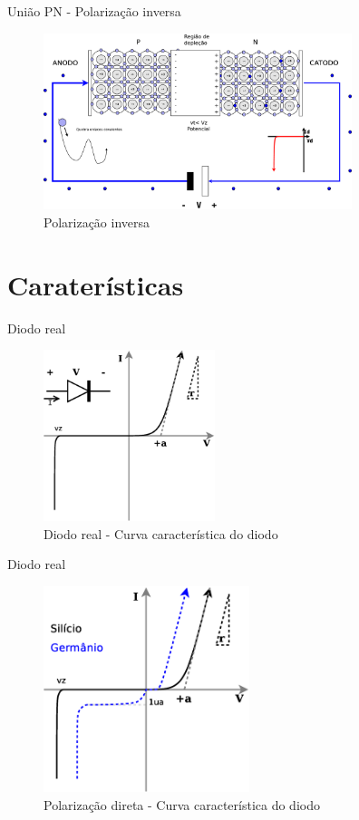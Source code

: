 \documentclass[envcountsect,dvips]{beamer}
\begin{document}
\begin{frame}{União PN - Polarização inversa }
\begin{figure}
\centering
\includegraphics[width=9cm]{images/semipn2.eps}
\caption{Polarização inversa}
\label{fig:semipn0}
\end{figure}
\end{frame}

\section{Caraterísticas}

\begin{frame}{Diodo  real}
\begin{figure}
\centering
\includegraphics[width=5cm]{images/dreal.eps}
\caption{Diodo real -  Curva característica do diodo}
\label{fig:dreal}
\end{figure}
\end{frame}

\begin{frame}{Diodo  real}
\begin{figure}
\centering
\includegraphics[width=6cm]{images/dreal2.eps}
\caption{Polarização direta -  Curva característica do diodo}
\label{fig:dreal}
\end{figure}
\end{frame}
\end{document}
